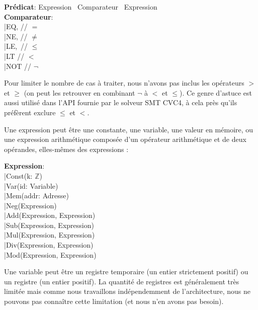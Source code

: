 \documentclass[french]{article}
\begin{document}
  \begin{algorithm}[H]
    \textbf{Prédicat}: Expression \texttimes~Comparateur \texttimes~Expression\\
        \textbf{Comparateur}:\\
            \qquad |\quad EQ, // $=$\\
            \qquad |\quad NE, // $\neq$\\
            \qquad |\quad LE,\, // $\leq$\\
            \qquad |\quad LT\: // $<$\\
            \qquad |\quad NOT\: // $\neg$\\
  \end{algorithm}
  
  Pour limiter le nombre de cas à traiter, nous n'avons pas inclus les opérateurs $>$ et $\geq$ (on peut les retrouver en combinant $\neg$ à $<$ et $\leq$). Ce genre d'astuce est aussi utilisé dans l'API fournie par le solveur SMT CVC4, à cela près qu'ils préfèrent exclure $\leq$ et $<$.
  
  Une expression peut être une constante, une variable, une valeur en mémoire, ou une expression arithmétique composée d'un opérateur arithmétique et de deux opérandes, elles-mêmes des expressions :

  \begin{algorithm}[H]
        \textbf{Expression}:\\
            \qquad |\quad Const(k: $\mathds{Z}$)\\
            \qquad |\quad Var(id: Variable)\\
            \qquad |\quad Mem(addr: Adresse)\\
            \qquad |\quad Neg(Expression)\\
            \qquad |\quad Add(Expression, Expression)\\
            \qquad |\quad Sub(Expression, Expression)\\
            \qquad |\quad Mul(Expression, Expression)\\
            \qquad |\quad Div(Expression, Expression)\\
            \qquad |\quad Mod(Expression, Expression)\\
  \end{algorithm}
  
  Une variable peut être un registre temporaire (un entier strictement positif) ou un registre (un entier positif). La quantité de registres est généralement très limitée mais comme nous travaillons indépendemment de l'architecture, nous ne pouvons pas connaître cette limitation (et nous n'en avons pas besoin).
\end{document}
